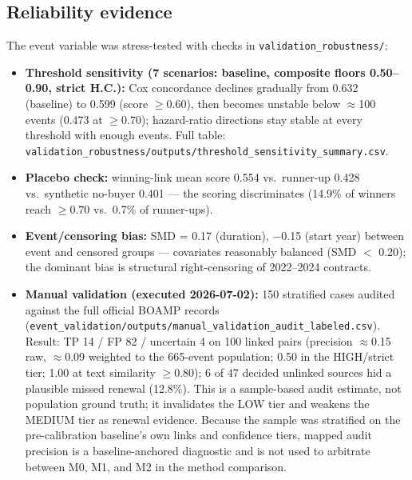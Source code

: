 \documentclass[11pt,a4paper]{article}
\begin{document}
\subsection{Reliability evidence}
The event variable was stress-tested with checks in \nolinkurl{validation_robustness/}:
\begin{itemize}[leftmargin=1.4em,itemsep=1pt]
  \item \textbf{Threshold sensitivity (7 scenarios: baseline, composite floors
        0.50--0.90, strict H.C.):} Cox concordance declines gradually from 0.632
        (baseline) to 0.599 (score $\geq 0.60$), then becomes unstable below
        $\approx$100 events (0.473 at $\geq 0.70$); hazard-ratio directions stay
        stable at every threshold with enough events.
        Full table: \nolinkurl{validation_robustness/outputs/threshold_sensitivity_summary.csv}.
  \item \textbf{Placebo check:} winning-link mean score 0.554 vs.\ runner-up
        0.428 vs.\ synthetic no-buyer 0.401 --- the scoring discriminates
        (14.9\% of winners reach $\geq 0.70$ vs.\ 0.7\% of runner-ups).
  \item \textbf{Event/censoring bias:} SMD = 0.17 (duration), $-$0.15 (start year)
        between event and censored groups --- covariates reasonably balanced
        (SMD $<$ 0.20); the dominant bias is structural right-censoring of
        2022--2024 contracts.
  \item \textbf{Manual validation (executed 2026-07-02):} 150 stratified cases
        audited against the full official BOAMP records
        (\nolinkurl{event_validation/outputs/manual_validation_audit_labeled.csv}).
        Result: TP 14 / FP 82 / uncertain 4 on 100 linked pairs
        (precision $\approx$0.15 raw, $\approx$0.09 weighted to the 665-event
        population; 0.50 in the HIGH/strict tier; 1.00 at text similarity
        $\geq$0.80); 6 of 47 decided unlinked sources hid a plausible missed
        renewal (12.8\%). This is a sample-based audit estimate, not
        population ground truth; it invalidates the LOW tier and weakens the
        MEDIUM tier as renewal evidence. Because the sample was stratified on
        the pre-calibration baseline's own links and confidence tiers, mapped
        audit precision is a baseline-anchored diagnostic and is not used to
        arbitrate between M0, M1, and M2 in the method comparison.
\end{itemize}
\end{document}

